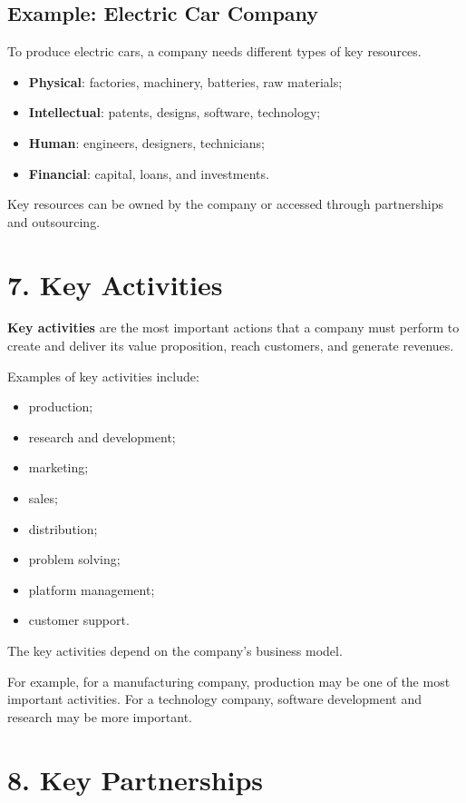 \documentclass[12pt,a4paper]{report}
\begin{document}
\subsection{Example: Electric Car Company}

To produce electric cars, a company needs different types of key resources.

\begin{itemize}
    \item \textbf{Physical}: factories, machinery, batteries, raw materials;
    \item \textbf{Intellectual}: patents, designs, software, technology;
    \item \textbf{Human}: engineers, designers, technicians;
    \item \textbf{Financial}: capital, loans, and investments.
\end{itemize}

Key resources can be owned by the company or accessed through partnerships and outsourcing.

\section{7. Key Activities}

\textbf{Key activities} are the most important actions that a company must perform to create and deliver its value proposition, reach customers, and generate revenues.

Examples of key activities include:

\begin{itemize}
    \item production;
    \item research and development;
    \item marketing;
    \item sales;
    \item distribution;
    \item problem solving;
    \item platform management;
    \item customer support.
\end{itemize}

The key activities depend on the company's business model.

For example, for a manufacturing company, production may be one of the most important activities. For a technology company, software development and research may be more important.

\section{8. Key Partnerships}
\end{document}
